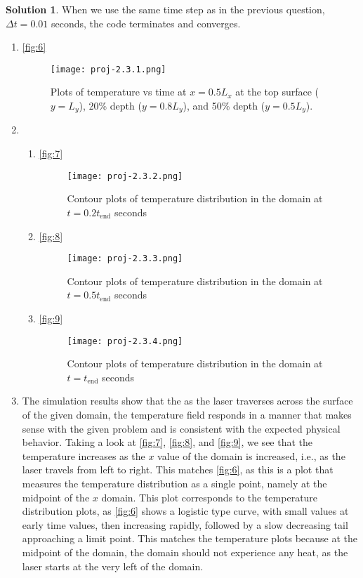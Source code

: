 \documentclass[12pt]{article}
\theoremstyle{definition} %
\newtheorem{solution}{Solution}
\theoremstyle{plain} %
\begin{document}
\begin{solution}
\noindent

When we use the same time step as in the previous question, $\Delta t=0.01$ seconds, the code terminates and converges.
     \begin{enumerate}
        \item \autoref{fig:6} \begin{figure}[htbp]
            \centering
            \texttt{[image: proj-2.3.1.png]}
            \caption{Plots of temperature vs time at $x = 0.5L_x$ at the top surface ($y = L_y$), 20\% depth ($y = 0.8L_y$), and 50\% depth ($y = 0.5L_y$).}
            \label{fig:6}
        \end{figure}
        \item \begin{enumerate}
           \item  \autoref{fig:7} \begin{figure}[htbp]
            \centering
            \texttt{[image: proj-2.3.2.png]}
            \caption{Contour plots of temperature distribution in the domain at $t = 0.2t_\text{end}$ seconds}
            \label{fig:7}
        \end{figure}
        \item \autoref{fig:8} \begin{figure}[htbp]
            \centering
            \texttt{[image: proj-2.3.3.png]}
            \caption{Contour plots of temperature distribution in the domain at $t = 0.5t_\text{end}$ seconds}
            \label{fig:8}
        \end{figure}
    \item \autoref{fig:9} \begin{figure}[htbp]
        \centering
        \texttt{[image: proj-2.3.4.png]}
        \caption{Contour plots of temperature distribution in the domain at $t = t_\text{end}$ seconds}
        \label{fig:9}
    \end{figure}
        \end{enumerate}
        \item The simulation results show that the as the laser traverses across the surface of the given domain, the temperature field responds in a manner that makes sense with the given problem and is consistent with the expected physical behavior. Taking a look at \autoref{fig:7}, \autoref{fig:8}, and \autoref{fig:9}, we see that the temperature increases as the $x$ value of the domain is increased, i.e., as the laser travels from left to right. This matches \autoref{fig:6}, as this is a plot that measures the temperature distribution as a single point, namely at the midpoint of the $x$ domain. This plot corresponds to the temperature distribution plots, as \autoref{fig:6} shows a logistic type curve, with small values at early time values, then increasing rapidly, followed by a slow decreasing tail approaching a limit point. This matches the temperature plots because at the midpoint of the domain, the domain should not experience any heat, as the laser starts at the very left of the domain. 
        \end{enumerate}


\end{solution}
\end{document}
